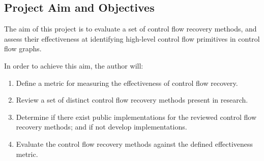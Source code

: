 
\subsection{Project Aim and Objectives}

The aim of this project is to evaluate a set of control flow recovery methods, and assess their effectiveness at identifying high-level control flow primitives in control flow graphs.

In order to achieve this aim, the author will:

\begin{enumerate}
	\item \label{itm:obj_define_effectiveness_metric} Define a metric for measuring the effectiveness of control flow recovery.
	\item \label{itm:obj_review_cfa_methods} Review a set of distinct control flow recovery methods present in research.
	\item \label{itm:obj_cfa_components} Determine if there exist public implementations for the reviewed control flow recovery methods; and if not develop implementations.
	\item \label{itm:obj_cfa_evaluation} Evaluate the control flow recovery methods against the defined effectiveness metric.
\end{enumerate}

